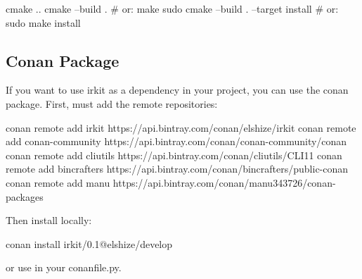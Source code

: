 \begin{DoxyCode}
cmake ..
cmake --build .  # or: make
sudo cmake --build . --target install  # or: sudo make install
\end{DoxyCode}


\subsection*{Conan Package}

If you want to use {\ttfamily irkit} as a dependency in your project, you can use the {\ttfamily conan} package. First, must add the remote repositories\+:


\begin{DoxyCode}
conan remote add irkit https://api.bintray.com/conan/elshize/irkit
conan remote add conan-community https://api.bintray.com/conan/conan-community/conan
conan remote add cliutils https://api.bintray.com/conan/cliutils/CLI11
conan remote add bincrafters https://api.bintray.com/conan/bincrafters/public-conan
conan remote add manu https://api.bintray.com/conan/manu343726/conan-packages
\end{DoxyCode}


Then install locally\+:


\begin{DoxyCode}
conan install irkit/0.1@elshize/develop
\end{DoxyCode}


or use in your {\ttfamily conanfile.\+py}. 